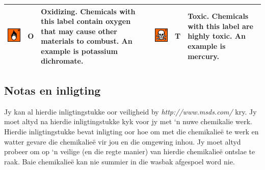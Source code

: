 \begin{table}[H]
\begin{center}
\begin{tabular}{|l|c|p{3cm}|l|c|p{3cm}|}
\parbox[c]{4em}{\includegraphics[width=.1\textwidth]{photos/oxidise.png}} & O & Oxidizing. Chemicals with this label contain oxygen that may cause other materials to combust. An example is potassium dichromate. & \parbox[c]{4em}{\includegraphics[width=.1\textwidth]{photos/toxic.png}} & T & Toxic. Chemicals with this label are highly toxic. An example is mercury. \\ \hline 
  \end{tabular}
 \end{center}
\end{table}
\subsection*{Notas en inligting}
Jy kan al hierdie inligtingstukke oor veiligheid by \textsl{http://www.msds.com/} kry. Jy moet altyd na hierdie inligtingstukke kyk voor jy met ‘n nuwe chemikalie werk. Hierdie inligtingstukke bevat inligting oor hoe om met die chemikalieë te werk en watter gevare die chemikalieë vir jou en die omgewing inhou. Jy moet altyd probeer om op ‘n veilige (en die regte manier) van hierdie chemikalieë ontslae te raak. Baie chemikalieë kan nie summier in die wasbak afgespoel word nie. 

